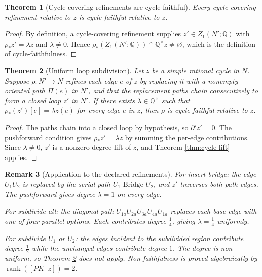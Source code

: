 \documentclass[11pt]{article}
\newtheorem{theorem}{Theorem}[section]
\newtheorem{remark}[theorem]{Remark}
\newcommand{\Q}{\mathbb{Q}}
\begin{document}
\begin{theorem}[Cycle-covering refinements are cycle-faithful]\label{thm:covering-faithful}
Every cycle-covering refinement relative to \(z\) is cycle-faithful
relative to \(z\).
\end{theorem}

\begin{proof}
By definition, a cycle-covering refinement supplies \(z'\in Z_1(N';\Q)\)
with \(\rho_*z'=\lambda z\) and \(\lambda\neq 0\). Hence
\(\rho_*(Z_1(N';\Q))\cap\Q^\times z\neq\varnothing\), which is the
definition of cycle-faithfulness.
\end{proof}

\begin{theorem}[Uniform loop subdivision]\label{thm:uniform-subdivision}
Let \(z\) be a simple rational cycle in \(N\). Suppose \(\rho:N'\to N\)
refines each edge \(e\) of \(z\) by replacing it with a nonempty
oriented path \(\Pi(e)\) in \(N'\), and that the replacement paths chain
consecutively to form a closed loop \(z'\) in \(N'\). If there exists
\(\lambda\in\Q^\times\) such that \(\rho_*(z')[e]=\lambda z(e)\) for
every edge \(e\) in \(z\), then \(\rho\) is cycle-faithful relative to
\(z\).
\end{theorem}

\begin{proof}
The paths chain into a closed loop by hypothesis, so \(\partial' z'=0\).
The pushforward condition gives \(\rho_*z'=\lambda z\) by summing the
per-edge contributions. Since \(\lambda\neq 0\), \(z'\) is a
nonzero-degree lift of \(z\), and Theorem \ref{thm:cycle-lift} applies.
\end{proof}

\begin{remark}[Application to the declared refinements]
For \emph{insert bridge}: the edge \(U_1U_2\) is replaced by the serial
path \(U_1\text{-Bridge-}U_2\), and \(z'\) traverses both path edges.
The pushforward gives degree \(\lambda=1\) on every edge.

For \emph{subdivide all}: the diagonal path \(U_{1a}U_{2a}U_{3a}U_{4a}U_{1a}\)
replaces each base edge with one of four parallel options. Each
contributes degree \(\tfrac{1}{4}\), giving \(\lambda=\tfrac{1}{4}\)
uniformly.

For \emph{subdivide \(U_1\) or \(U_2\)}: the edges incident to the
subdivided region contribute degree \(\tfrac{1}{2}\) while the unchanged
edges contribute degree \(1\). The degree is non-uniform, so Theorem
\ref{thm:uniform-subdivision} does not apply. Non-faithfulness is proved
algebraically by \(\operatorname{rank}([PK\;\;z])=2\).
\end{remark}
\end{document}

